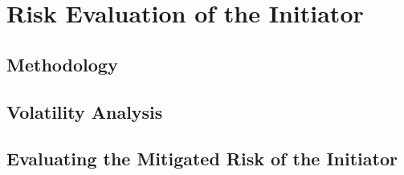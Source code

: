 \section{Risk Evaluation of the Initiator}
\label{sec:evaluation}

\subsection{Methodology}

\subsection{Volatility Analysis}

\subsection{Evaluating the Mitigated Risk of the Initiator}